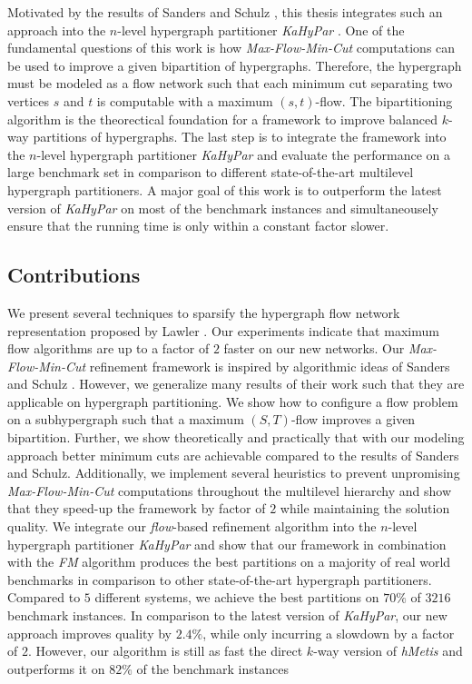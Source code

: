Motivated by the results of Sanders and Schulz \cite{sanders2011engineering}, this thesis
integrates such an approach into the $n$-level hypergraph partitioner \emph{KaHyPar} \cite{heuer2017improving}.
One of the fundamental questions of this work is how \emph{Max-Flow-Min-Cut} computations
can be used to improve a given bipartition of hypergraphs. Therefore, the hypergraph
must be modeled as a flow network such that each minimum cut separating two vertices
$s$ and $t$ is computable with a maximum $(s,t)$-flow. The bipartitioning algorithm is 
the theorectical foundation for a framework to improve balanced $k$-way partitions of hypergraphs.
The last step is to integrate the framework into the
$n$-level hypergraph partitioner \emph{KaHyPar} \cite{heuer2017improving} and evaluate
the performance on a large benchmark set in comparison to different state-of-the-art 
multilevel hypergraph partitioners. A major goal of this work is to outperform the 
latest version of \emph{KaHyPar} on most of the benchmark instances and simultaneousely
ensure that the running time is only within a constant factor slower.

\subsection{Contributions}

We present several techniques to sparsify the hypergraph flow network
representation proposed by Lawler \cite{lawler1973}. Our experiments indicate that
maximum flow algorithms are up to a factor of $2$ faster on our new networks. 
Our \emph{Max-Flow-Min-Cut} refinement framework is inspired by algorithmic ideas of
Sanders and Schulz \cite{sanders2011engineering}. However, we generalize many results of
their work such that they are applicable on hypergraph partitioning. We show how to 
configure a flow problem on a subhypergraph such that a 
maximum $(S,T)$-flow improves a given bipartition. 
Further, we show theoretically and practically that with our modeling approach 
better minimum cuts are achievable compared to the results of Sanders and Schulz.
Additionally, we implement several heuristics to prevent unpromising \emph{Max-Flow-Min-Cut} computations 
throughout the multilevel hierarchy and show that they speed-up the framework by factor
of $2$ while maintaining the solution quality.
We integrate our \emph{flow}-based refinement algorithm into the $n$-level hypergraph partitioner
\emph{KaHyPar} and show that our framework in combination with the
\emph{FM} algorithm produces the best partitions on a majority of real world benchmarks
in comparison to other state-of-the-art hypergraph partitioners. 
Compared to $5$ different systems, we achieve the best partitions on $70\%$ 
of $3216$ benchmark instances. In comparison to the 
latest version of \emph{KaHyPar}, our new approach improves quality by
$2.4\%$, while only incurring a slowdown by a factor of $2$.
However, our algorithm is still as fast the direct $k$-way
version of \emph{hMetis} and outperforms it on $82\%$ of the benchmark instances

